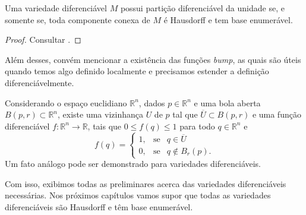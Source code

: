 \begin{theorem}
	\label{teo:particao-da-unidade}
	Uma variedade diferenciável $M$ possui partição diferenciável da unidade se, e somente se, toda componente conexa de $M$ é Hausdorff e tem base enumerável.
	\begin{proof}
		Consultar \textcite{leeSmooth2013}.
	\end{proof}
\end{theorem}
Além desses, convém mencionar a existência das funções \textit{bump}, as quais são úteis quando temos algo definido localmente e precisamos estender a definição diferenciávelmente.
\begin{lemma}
	\label{lem:funcoes-bump}
	Considerando o espaço euclidiano $\mathbb{R}^{n}$, dados $p \in \mathbb{R}^{n}$ e uma bola aberta $B(p, r) \subset \mathbb{R}^{n}$, existe uma vizinhança $U$ de $p$ tal que $\overline{U} \subset B(p, r)$ e uma função diferenciável $f:\mathbb{R}^{n}\to \mathbb{R}$, tais que $0\leq f(q)\leq1$ para todo $q \in \mathbb{R}^{n}$ e
	\begin{equation*}
		f(q)=\left\{\begin{array}{lcl}
			1, & \mbox{se} & q \in \overline{U} \\
			0, & \mbox{se} & q \notin B_{r}(p).
		\end{array}\right.
	\end{equation*}
	Um fato análogo pode ser demonstrado para variedades diferenciáveis.
\end{lemma}
Com isso, exibimos todas as preliminares acerca das variedades diferenciáveis necessárias. Nos próximos capítulos vamos supor que todas as variedades diferenciáveis são Hausdorff e têm base enumerável.

